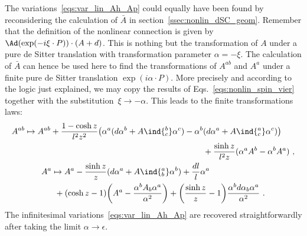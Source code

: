 \documentclass[11pt]{article}
\begin{document}
The variations~\eqref{eqs:var_lin_Ah_Ap} could equally have been 
found by reconsidering the calculation of $\bar{A}$ in 
section~\ref{ssec:nonlin_dSC_geom}. Remember that the definition 
of the nonlinear connection is given by $\Ad(\exp(-i\xi\cdot 
P))\cdot(A + d)$. This is nothing but the transformation of $A$ 
under a pure de Sitter translation with transformation parameter 
$\alpha = -\xi$. The calculation of $\bar{A}$ can hence be used 
here to find the transformations of $A^{ab}$ and $A^a$ under a 
finite pure de Sitter translation $\exp(i\alpha\cdot P)$. More 
precisely and according to the logic just explained, we may copy 
the results of Eqs.~\eqref{eqs:nonlin_spin_vier} together with 
the substitution~$\xi \to -\alpha$. This leads to the finite 
transformations laws:
\begin{subequations}
\begin{gather}
\begin{multlined}[b][\linewidth-8\multlinegap]
	\label{eq:transvec_fin_Ah}
	A^{ab} \mapsto A^{ab} + \frac{1 - \cosh z}{l^2 z^2} \big( 
	\alpha^a (d\alpha^b + A\ind{^b_c} \alpha^c) - \alpha^b 
	(d\alpha^a + A\ind{^a_c} \alpha^c) \big) \\
	+ \frac{\sinh z}{l^2 z} (\alpha^a A^b - \alpha^b A^a)
\end{multlined}~,
	\\
\begin{multlined}[b][\linewidth-8\multlinegap]
	\label{eq:transvec_fin_Ap}
	A^a \mapsto A^a - \frac{\sinh z}{z}( d\alpha^a + A\ind{^a_b} 
	\alpha^b) + \frac{dl}{l} \alpha ^a \\
	+ (\cosh z - 1) \bigg( A^a - \frac{\alpha^b A_b 
		\alpha^a}{\alpha^2} \bigg)
	+ \bigg( \frac{\sinh z}{z} - 1 \bigg) \frac{\alpha^b d\alpha_b 
		\alpha^a}{\alpha^2}
\end{multlined}~.
\end{gather}
\end{subequations}
The infinitesimal variations~\eqref{eqs:var_lin_Ah_Ap} are 
recovered straightforwardly after taking the limit $\alpha \to 
\epsilon$.
\end{document}
